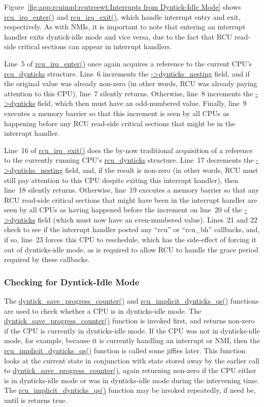 Figure~\ref{fig:app:rcuimpl:rcutreewt:Interrupts from Dyntick-Idle Mode}
shows \url{rcu_irq_enter()} and \url{rcu_irq_exit()}, which handle
interrupt entry and exit, respectively.
As with NMIs, it is important to note that entering an interrupt
handler exits dyntick-idle mode and vice versa, due to the fact
that RCU read-side critical sections can appear in interrupt handlers.

Line~5 of \url{rcu_irq_enter()} once again acquires a reference to
the current CPU's \url{rcu_dynticks} structure.
Line~6 increments the \url{->dynticks_nesting} field, and if the
original value was already non-zero (in other words, RCU was
already paying attention to this CPU), line~7 silently returns.
Otherwise, line~8 increments the  \url{->dynticks} field, which
then must have an odd-numbered value.
Finally, line~9 executes a memory barrier so that this increment
is seen by all CPUs as happening before any RCU read-side critical
sections that might be in the interrupt handler.

Line~16 of \url{rcu_irq_exit()} does the by-now traditional acquisition
of a reference to the currently running CPU's \url{rcu_dynticks} structure.
Line~17 decrements the \url{->dynticks_nesting} field, and, if the
result is non-zero (in other words, RCU must still pay attention
to this CPU despite exiting this interrupt handler), then line~18
silently returns.
Otherwise, line~19 executes a memory barrier so that any RCU read-side
critical sections that might have been in the interrupt handler are
seen by all CPUs as having happened before the increment on line~20
of the \url{->dynticks} field (which must now have an even-numbered
value).
Lines~21 and 22 check to see if the interrupt handler posted any
``rcu'' or ``rcu\_bh'' callbacks, and, if so, line~23 forces this
CPU to reschedule, which has the side-effect of forcing it out of
dynticks-idle mode, as is required to allow RCU to handle the
grace period required by these callbacks.

\subsubsection{Checking for Dyntick-Idle Mode}
\label{app:rcuimpl:rcutreewt:Checking for Dyntick-Idle Mode}

The \url{dyntick_save_progress_counter()} and
\url{rcu_implicit_dynticks_qs()} functions are used to check
whether a CPU is in dynticks-idle mode.
The \url{dyntick_save_progress_counter()} function is invoked first,
and returns non-zero if the CPU is currently in dynticks-idle mode.
If the CPU was not in dynticks-idle mode, for example, because it is
currently handling an interrupt or NMI, then the
\url{rcu_implicit_dynticks_qs()} function is called some jiffies later.
This function looks at the current state in conjunction with state
stored away by the earlier call to \url{dyntick_save_progress_counter()},
again returning non-zero if the CPU either is in dynticks-idle mode or
was in dynticks-idle mode during the intervening time.
The \url{rcu_implicit_dynticks_qs()} function may be invoked repeatedly,
if need be, until is returns true.

